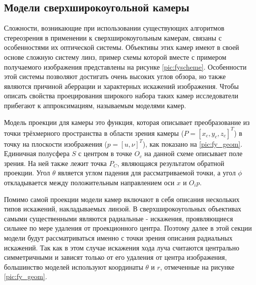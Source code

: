 \subsection{Модели сверхширокоугольной камеры}
\label{camera_model}
Сложности, возникающие при использовании существующих алгоритмов стереозрения  в применении к сверхширокоугольным камерам, связаны с
 особенностями их оптической системы. Объективы  этих камер имеют в своей основе сложную систему линз, пример схемы которой вместе с примером
 получаемого изображения представлены на рисунке \ref{pic:fyscheme}. Особенности этой системы позволяют достигать очень высоких углов обзора,
  но также являются причиной аберрации и характерных искажений изображения. Чтобы описать свойства проецирования широкого набора таких
камер исследователи прибегают к аппроксимациям, называемым моделями камер. 


Модель проекции для камеры это функция, которая описывает преобразование из точки трёхмерного пространства  в области зрения 
камеры ($P=[x_c, y_c, z_c]^T$) в точку на плоскости изображения ($p=[u, \nu]^T$), как показано на \ref{pic:fy_geom}. Единичная            %
полусфера $S$ с центром в точке $O_c$ на данной схеме описывает поле зрения. На ней также лежит точка $P_C$, являющаяся результатом обратной проекции.    %
Угол $\theta$ является углом падения для рассматриваемой точки, а угол $\phi$ откладывается между положительным направлением оси $x$ и $O_{i}{p}$. 


Помимо самой проекции модели камер включают в себя описания нескольких типов искажений, накладываемых линзой. В сверхширокоугольных объективах самыми существенными являются 
радиальные - искажения, проявляющиеся сильнее по мере удаления от проекционного центра. Поэтому далее в этой секции модели будут рассматриваться именно с точки зрения 
описания радиальных искажений. Так как в этом случае искажения хода луча считаются центрально симметричными и зависят только от его удаления от центра изображения, 
большинство моделей используют координаты $\theta$ и  $r$, отмеченные на рисунке \ref{pic:fy_geom}.



